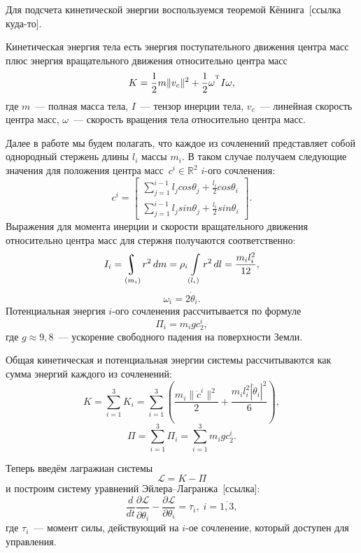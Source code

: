 Для подсчета кинетической энергии воспользуемся теоремой Кёнинга~[ссылка куда-то].
\begin{theorem}[Кёнинг]
    Кинетическая энергия тела есть энергия поступательного движения центра масс плюс энергия вращательного движения относительно центра масс
    \begin{equation}\label{eq:kin-energy}
        K = \frac{1}{2} m \|v_c\|^2 + \frac{1}{2}\omega^{^\mathrm{T}} I \omega,
    \end{equation}
    где $m$~--- полная масса тела, $I$~--- тензор инерции тела, $v_c$~--- линейная скорость центра масс, $\omega$~--- скорость вращения тела относительно центра масс.
\end{theorem}

Далее в работе мы будем полагать, что каждое из сочленений представляет собой однородный стержень длины $l_i$ массы $m_i$.
В таком случае получаем следующие значения для положения центра масс~$c^i \in \mathbb{R}^2$ $i$-ого сочленения:
$$
    c^i =
    \left[\begin{aligned}
        \sum_{j=1}^{i-1} l_j cos\theta_j + \frac{l_i}{2}cos\theta_i \\
        \sum_{j=1}^{i-1} l_j sin\theta_j + \frac{l_i}{2}sin\theta_i
    \end{aligned}\right].
$$
Выражения для момента инерции и скорости вращательного движения относительно центра масс для стержня получаются соответственно:
$$
    I_i = \uint\limits_{(m_i)} r^2\,dm = \rho_i\int\limits_{(l_i)} r^2\,dl = \frac{m_il_i^2}{12},
$$
$$
    \omega_i = 2\dot \theta_i.
$$
Потенциальная энергия $i$-ого сочленения рассчитывается по формуле
$$
    \Pi_i = m_i g c^i_2,
$$
где $g \approx 9,\!8$~--- ускорение свободного падения на поверхности Земли.

Общая кинетическая и потенциальная энергии системы рассчитываются как сумма энергий каждого из сочленений:
$$
    K = \sum_{i=1}^{3} K_i = \sum_{i=1}^{3}\left( \frac{m_i \|\dot c^i\|^2}{2} + \frac{m_i l_i^2 |\dot \theta_i|^2}{6} \right),
$$
$$
    \Pi = \sum_{i=1}^{3} \Pi_i = \sum_{i=1}^{3} m_i g c^i_2.
$$

Теперь введём лагражиан системы
$$
    \mathcal{L} = K - \Pi
$$
и построим систему уравнений Эйлера--Лагранжа~[ссылка]:
\begin{equation}\label{eq:euler-lagrange}
    \frac{d}{dt} \frac{\partial \mathcal{L}}{\partial \dot \theta_i} - \frac{\partial \mathcal{L}}{\partial \theta_i} = \tau_i,\; i = \overline{1, 3},
\end{equation}
где $\tau_i$~--- момент силы, действующий на $i$-ое сочленение, который доступен для управления.

